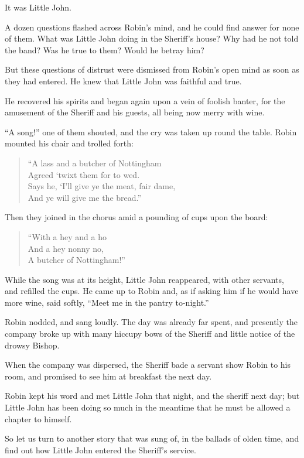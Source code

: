 It was Little John.

A dozen questions flashed across Robin's mind, and he could find answer
for none of them. What was Little John doing in the Sheriff's house? Why
had he not told the band? Was he true to them? Would he betray him?

But these questions of distrust were dismissed from Robin's open mind as
soon as they had entered. He knew that Little John was faithful and
true.

He recovered his spirits and began again upon a vein of foolish banter,
for the amusement of the Sheriff and his guests, all being now merry
with wine.

``A song!'' one of them shouted, and the cry was taken up round the
table. Robin mounted his chair and trolled forth:

\begin{quote}
“A lass and a butcher of Nottingham\\
Agreed ‘twixt them for to wed.\\
Says he, ‘I’ll give ye the meat, fair dame,\\
And ye will give me the bread.”
\end{quote}

Then they joined in the chorus amid a pounding of cups upon the board:

\begin{quote}
“With a hey and a ho\\
And a hey nonny no,\\
A butcher of Nottingham!”
\end{quote}

While the song was at its height, Little John reappeared, with other
servants, and refilled the cups. He came up to Robin and, as if asking
him if he would have more wine, said softly, ``Meet me in the pantry
to-night.''

Robin nodded, and sang loudly. The day was already far spent, and
presently the company broke up with many hiccupy bows of the Sheriff and
little notice of the drowsy Bishop.

When the company was dispersed, the Sheriff bade a servant show Robin to
his room, and promised to see him at breakfast the next day.

Robin kept his word and met Little John that night, and the sheriff next
day; but Little John has been doing so much in the meantime that he must
be allowed a chapter to himself.

So let us turn to another story that was sung of, in the ballads of
olden time, and find out how Little John entered the Sheriff's service.
